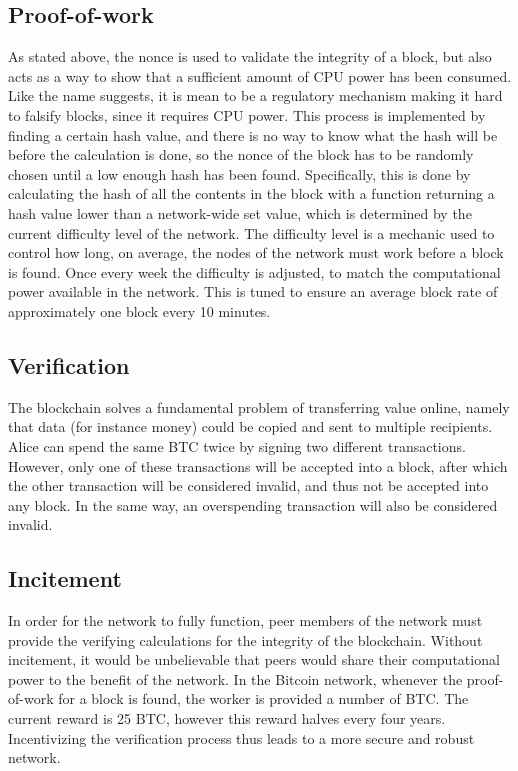 \subsection{Proof-of-work}
As stated above, the nonce is used to validate the integrity of a block, but also acts as a way to show that a sufficient amount of CPU power has been consumed. Like the name suggests, it is mean to be a regulatory mechanism making it hard to falsify blocks, since it requires CPU power. This process is implemented by finding a certain hash value, and there is no way to know what the hash will be before the calculation is done, so the nonce of the block has to be randomly chosen until a low enough hash has been found. Specifically, this is done by calculating the hash of all the contents in the block with a function returning a hash value lower than a network-wide set value, which is determined by the current difficulty level of the network. The difficulty level is a mechanic used to control how long, on average, the nodes of the network must work before a block is found. Once every week the difficulty is adjusted, to match the computational power available in the network. This is tuned to ensure an average block rate of approximately one block every 10 minutes. 

\subsection{Verification}
The blockchain solves a fundamental problem of transferring value online, namely that data (for instance money) could be copied and sent to multiple recipients. Alice can spend the same BTC twice by signing two different transactions. However, only one of these transactions will be accepted into a block, after which the other transaction will be considered invalid, and thus not be accepted into any block. In the same way, an overspending transaction will also be considered invalid.

\subsection{Incitement}
In order for the network to fully function, peer members of the network must provide the verifying calculations for the integrity of the blockchain. Without incitement, it would be unbelievable that peers would share their computational power to the benefit of the network. In the Bitcoin network, whenever the proof-of-work for a block is found, the worker is provided a number of BTC. The current reward is 25 BTC, however this reward halves every four years. Incentivizing the verification process thus leads to a more secure and robust network.

